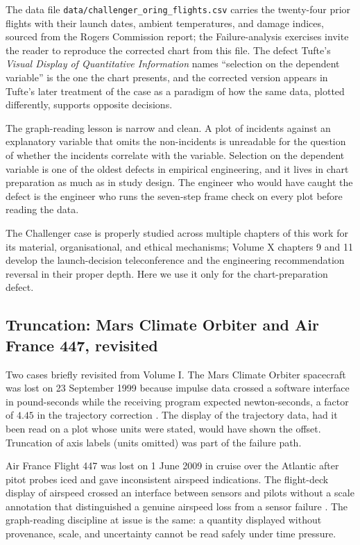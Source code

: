 The data file
\texttt{data/challenger\_oring\_flights.csv} carries the twenty-four
prior flights with their launch dates, ambient temperatures, and
damage indices, sourced from the Rogers Commission report; the
Failure-analysis exercises invite the reader to reproduce the
corrected chart from this file. The defect Tufte's \emph{Visual
Display of Quantitative Information}
\cite{v2c02-text:tufte2001} names ``selection on the dependent
variable'' is the one the chart presents, and the corrected version
appears in Tufte's later treatment of the case as a paradigm of
how the same data, plotted differently, supports opposite
decisions.

The graph-reading lesson is narrow and clean. A plot of incidents
against an explanatory variable that omits the non-incidents is
unreadable for the question of whether the incidents correlate with
the variable. Selection on the dependent variable is one of the
oldest defects in empirical engineering, and it lives in chart
preparation as much as in study design. The engineer who would have
caught the defect is the engineer who runs the seven-step frame check
on every plot before reading the data.

The Challenger case is properly studied across multiple chapters of
this work for its material, organisational, and ethical mechanisms;
Volume X chapters 9 and 11 develop the launch-decision teleconference
and the engineering recommendation reversal in their proper depth.
Here we use it only for the chart-preparation defect.

\subsection{Truncation: Mars Climate Orbiter and Air France 447,
revisited}

Two cases briefly revisited from Volume I. The Mars Climate Orbiter
spacecraft was lost on 23 September 1999 because impulse data crossed
a software interface in pound-seconds while the receiving program
expected newton-seconds, a factor of $4.45$ in the trajectory
correction \cite{acc:nasa-mco-mib}. The display of the trajectory
data, had it been read on a plot whose units were stated, would have
shown the offset. Truncation of axis labels (units omitted) was part
of the failure path.

Air France Flight 447 was lost on 1 June 2009 in cruise over the
Atlantic after pitot probes iced and gave inconsistent airspeed
indications. The flight-deck display of airspeed crossed an interface
between sensors and pilots without a scale annotation that
distinguished a genuine airspeed loss from a sensor failure
\cite{acc:bea-af447}. The graph-reading discipline at issue is the
same: a quantity displayed without provenance, scale, and uncertainty
cannot be read safely under time pressure.


